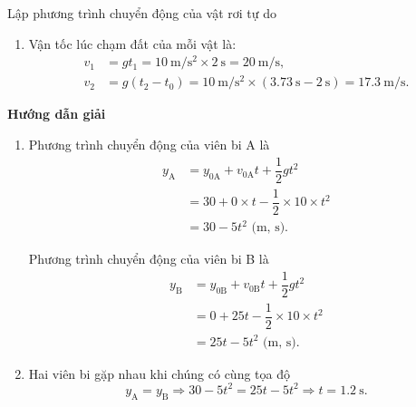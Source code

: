 \begin{dang}{Lập phương trình chuyển động của vật rơi tự do}
{\begin{enumerate}[label=\alph*.]
			Vậy hai vật không chạm đất cùng lúc.
			\item Vận tốc lúc chạm đất của mỗi vật là:
			\begin{align*}
				v_1&=gt_1=\SI{10}{\meter/\second^{2}}\times\SI{2}{\second}=\SI{20}{\meter/\second},\\
				v_2&=g(t_2-t_0)=\SI{10}{\meter/\second^{2}}\times(\SI{3.73}{\second}-\SI{2}{\second})=\SI{17.3}{\meter/\second}.
			\end{align*}
		\end{enumerate}
	}
	
	{	\begin{center}
			\textbf{Hướng dẫn giải}
		\end{center}
		
		\begin{enumerate}[label=\alph*.]
			\item 
			Phương trình chuyển động của viên bi A là
			\begin{align*}
				y_{\text{A}}&=y_{0\text{A}}+v_{0\text{A}}t+\dfrac{1}{2}gt^2\\
				&=30+0\times t-\dfrac{1}{2}\times 10\times t^{2}\\
				&=30-5t^2 \textrm{ (m, s)}.
			\end{align*}
			
			Phương trình chuyển động của viên bi B là
			\begin{align*}
				y_{\text{B}}&=y_{0\text{B}}+v_{0\text{B}}t+\dfrac{1}{2}gt^2\\
				&=0+25t-\dfrac{1}{2}\times10\times t^{2}\\
				&=25t-5t^2\textrm{ (m, s)}.
			\end{align*}
			\item 
			Hai viên bi gặp nhau khi chúng có cùng tọa độ
			\begin{equation*}
				y_{\text{A}}=y_{\text{B}}\Rightarrow 30-5t^2=25t-5t^2 \Rightarrow t=\SI{1.2}{\second}.
			\end{equation*}
			

\end{enumerate}}
\end{dang}
